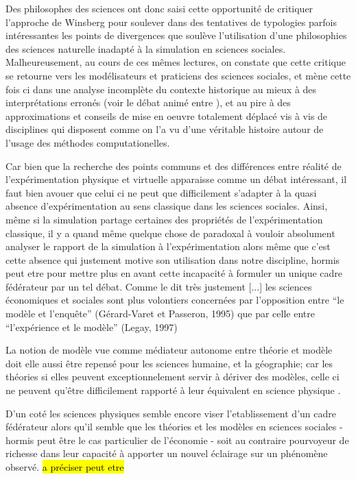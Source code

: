 Des philosophes des sciences ont donc saisi cette opportunité de critiquer l'approche de Winsberg pour soulever dans des tentatives de typologies parfois intéressantes \autocite{Eckhart2010} les points de divergences que soulève l'utilisation d'une philosophies des sciences naturelle inadapté à la simulation en sciences sociales. Malheureusement, au cours de ces mêmes lectures, on constate que cette critique se retourne vers les modélisateurs et praticiens des sciences sociales, et mène cette fois ci dans une analyse incomplète du contexte historique au mieux à des interprétations erronés (voir le débat animé entre \autocite{Yanoff2008}  \autocites{Elsenbroich2012, Chattoe2011}), et au pire à des approximations et  conseils de mise en oeuvre totalement déplacé \autocite{Eckhart2010} vis à vis de disciplines qui disposent comme on l'a vu d'une véritable histoire autour de l'usage des méthodes computationelles.

Car bien que la recherche des points communs et des différences entre réalité de l'expérimentation physique et virtuelle apparaisse comme un débat intéressant, il faut bien avouer que celui ci ne peut que difficilement s'adapter à la quasi absence d'expérimentation au sens classique dans les sciences sociales. Ainsi, même si la simulation partage certaines des propriétés de l'expérimentation classique, il y a quand même quelque chose de paradoxal à vouloir absolument analyser le rapport de la simulation à l'expérimentation alors même que c'est cette absence qui justement motive son utilisation dans notre discipline, hormis peut etre pour mettre plus en avant cette incapacité à formuler un unique cadre fédérateur par un tel débat. Comme le dit très justement \textcite{Phan2008} {[...] les sciences économiques et sociales sont plus volontiers concernées par l’opposition entre \enquote{le modèle et l’enquête}  (Gérard-Varet et Passeron, 1995) que par celle entre \enquote{l’expérience et le modèle} (Legay, 1997)}

La notion de modèle vue comme médiateur autonome entre théorie et modèle doit elle aussi être repensé pour les sciences humaine, et la géographie; car les théories si elles peuvent exceptionnelement servir à dériver des modèles, celle ci ne peuvent qu'être difficilement rapporté à leur équivalent en science physique \autocite{Pumain1997}.

D'un coté les sciences physiques semble encore viser l'etablissement d'un cadre fédérateur alors qu'il semble que les théories et les modèles en sciences sociales - hormis peut être le cas particulier de l'économie - soit au contraire pourvoyeur de richesse dans leur capacité à apporter un nouvel éclairage sur un phénomène observé. \hl{a préciser peut etre}

